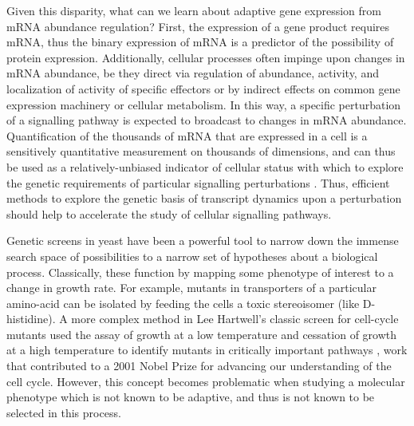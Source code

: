 Given this disparity, what can we learn about adaptive
gene expression from mRNA abundance regulation? First, the expression
of a gene product requires mRNA, thus the binary expression of mRNA is
a predictor of the possibility of protein expression. Additionally,
cellular processes often impinge upon changes in mRNA abundance, be
they direct via regulation of abundance, activity, and localization of
activity of specific effectors or by indirect effects on common gene
expression machinery or cellular metabolism. In this way, a specific
perturbation of a signalling pathway is expected to broadcast to
changes in mRNA abundance. Quantification of the thousands of mRNA
that are expressed in a cell is a sensitively quantitative measurement
on thousands of dimensions, and can thus be used as a
relatively-unbiased indicator of cellular status with which to explore
the genetic requirements of particular signalling perturbations 
\parencite{gapp2016parallel}. Thus, efficient methods to explore the genetic
basis of transcript dynamics upon a perturbation should help to
accelerate the study of cellular signalling pathways.  

Genetic screens
in yeast have been a powerful tool to narrow down the immense search
space of possibilities to a narrow set of hypotheses about a
biological process. Classically, these function by mapping some
phenotype of interest to a change in growth rate. For example, mutants
in transporters of a particular amino-acid can be isolated by feeding
the cells a toxic stereoisomer (like D-histidine). A more complex
method in Lee Hartwell's classic screen for cell-cycle mutants used
the assay of growth at a low temperature and cessation of growth at a
high temperature to identify mutants in critically important pathways
\parencite{hartwell1970genetic}, work that contributed to a 2001 Nobel Prize for
advancing our understanding of the cell cycle. However, this concept
becomes problematic when studying a molecular phenotype which is not
known to be adaptive, and thus is not known to be selected in this
process.

